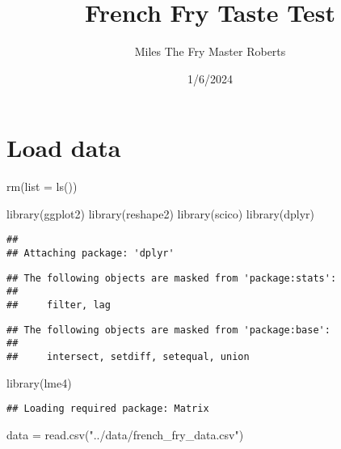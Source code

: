 \documentclass[
]{article}
\title{French Fry Taste Test}
\author{Miles The Fry Master Roberts}
\date{1/6/2024}
\newenvironment{Shaded}{\begin{snugshade}}{\end{snugshade}}
\newcommand{\AttributeTok}[1]{\textcolor[rgb]{0.77,0.63,0.00}{#1}}
\newcommand{\FunctionTok}[1]{\textcolor[rgb]{0.00,0.00,0.00}{#1}}
\newcommand{\NormalTok}[1]{#1}
\newcommand{\OtherTok}[1]{\textcolor[rgb]{0.56,0.35,0.01}{#1}}
\newcommand{\StringTok}[1]{\textcolor[rgb]{0.31,0.60,0.02}{#1}}
\begin{document}
\maketitle

\hypertarget{load-data}{%
\section{Load data}\label{load-data}}

\begin{Shaded}
\begin{Highlighting}[]
\FunctionTok{rm}\NormalTok{(}\AttributeTok{list =} \FunctionTok{ls}\NormalTok{())}

\FunctionTok{library}\NormalTok{(ggplot2)}
\FunctionTok{library}\NormalTok{(reshape2)}
\FunctionTok{library}\NormalTok{(scico)}
\FunctionTok{library}\NormalTok{(dplyr)}
\end{Highlighting}
\end{Shaded}

\begin{verbatim}
## 
## Attaching package: 'dplyr'
\end{verbatim}

\begin{verbatim}
## The following objects are masked from 'package:stats':
## 
##     filter, lag
\end{verbatim}

\begin{verbatim}
## The following objects are masked from 'package:base':
## 
##     intersect, setdiff, setequal, union
\end{verbatim}

\begin{Shaded}
\begin{Highlighting}[]
\FunctionTok{library}\NormalTok{(lme4)}
\end{Highlighting}
\end{Shaded}

\begin{verbatim}
## Loading required package: Matrix
\end{verbatim}

\begin{Shaded}
\begin{Highlighting}[]
\NormalTok{data }\OtherTok{=} \FunctionTok{read.csv}\NormalTok{(}\StringTok{"../data/french\_fry\_data.csv"}\NormalTok{)}
\end{Highlighting}
\end{Shaded}
\end{document}
